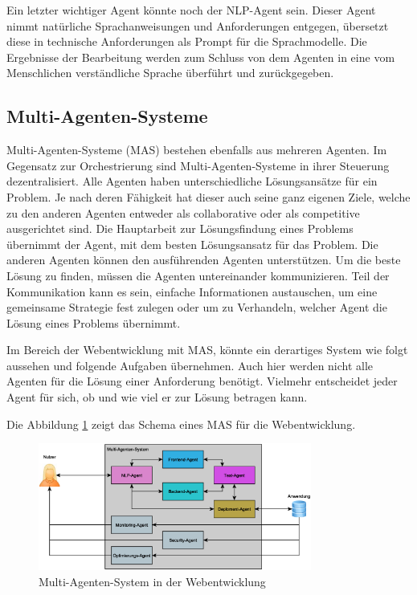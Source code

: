 Ein letzter wichtiger Agent könnte noch der NLP-Agent sein. Dieser Agent nimmt natürliche Sprachanweisungen und Anforderungen entgegen, übersetzt diese in technische Anforderungen als Prompt für die Sprachmodelle. Die Ergebnisse der Bearbeitung werden zum Schluss von dem Agenten in eine vom Menschlichen verständliche Sprache überführt und zurückgegeben.

\subsection{Multi-Agenten-Systeme}
Multi-Agenten-Systeme (\acrshort{MAS}) bestehen ebenfalls aus mehreren Agenten. Im Gegensatz zur Orchestrierung sind Multi-Agenten-Systeme in ihrer Steuerung dezentralisiert. Alle Agenten haben unterschiedliche Lösungsansätze für ein Problem. Je nach deren Fähigkeit hat dieser auch seine ganz eigenen Ziele, welche zu den anderen Agenten entweder als \gls{collaborative} oder als \gls{competitive} ausgerichtet sind. Die Hauptarbeit zur Lösungsfindung eines Problems übernimmt der Agent, mit dem besten Lösungsansatz für das Problem. Die anderen Agenten können den ausführenden Agenten unterstützen. Um die beste Lösung zu finden, müssen die Agenten untereinander kommunizieren.  Teil der Kommunikation kann es sein, einfache Informationen austauschen, um eine gemeinsame Strategie fest zulegen oder um zu Verhandeln, welcher Agent die Lösung eines Problems übernimmt.\vspace{0.2cm}

Im Bereich der Webentwicklung mit MAS, könnte ein derartiges System wie folgt aussehen und folgende Aufgaben übernehmen. Auch hier werden nicht alle Agenten für die Lösung einer Anforderung benötigt. Vielmehr entscheidet jeder Agent für sich, ob und wie viel er zur Lösung betragen kann.

Die Abbildung \ref{img:mas_web_development_schema} zeigt das Schema eines MAS für die Webentwicklung.

\begin{center}
	\begin{figure}[!ht]
		\includegraphics[width=0.8\textwidth]{content/chapter_basics/images/mas_web_development_schema.eps}
		\centering
		\caption{Multi-Agenten-System in der Webentwicklung}
		\label{img:mas_web_development_schema}
	\end{figure}
\end{center}

